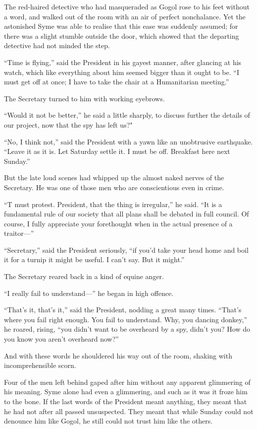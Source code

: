 \documentclass{book}
\begin{document}
The red-haired detective who had masqueraded as Gogol rose to his feet without a word, and walked out of the room with an air of perfect nonchalance. Yet the astonished Syme was able to realise that this ease was suddenly assumed; for there was a slight stumble outside the door, which showed that the departing detective had not minded the step.

“Time is flying,” said the President in his gayest manner, after glancing at his watch, which like everything about him seemed bigger than it ought to be. “I must get off at once; I have to take the chair at a Humanitarian meeting.”

The Secretary turned to him with working eyebrows.

“Would it not be better,” he said a little sharply, to discuss further the details of our project, now that the spy has left us?"

“No, I think not,” said the President with a yawn like an unobtrusive earthquake. “Leave it as it is. Let Saturday settle it. I must be off. Breakfast here next Sunday.”

But the late loud scenes had whipped up the almost naked nerves of the Secretary. He was one of those men who are conscientious even in crime.

“T must protest. President, that the thing is irregular,” he said. “It is a fundamental rule of our society that all plans shall be debated in full council. Of course, I fully appreciate your forethought when in the actual presence of a traitor—”

“Secretary,” said the President seriously, “if you’d take your head home and boil it for a turnip it might be useful. I can’t say. But it might.”

The Secretary reared back in a kind of equine anger.

“I really fail to understand—” he began in high offence.

“That’s it, that’s it,” said the President, nodding a great many times. “That’s where you fail right enough. You fail to understand. Why, you dancing donkey,” he roared, rising, “you didn’t want to be overheard by a spy, didn’t you? How do you know you aren’t overheard now?”

And with these words he shouldered his way out of the room, shaking with incomprehensible scorn.

Four of the men left behind gaped after him without any apparent glimmering of his meaning. Syme alone had even a glimmering, and such as it was it froze him to the bone. If the last words of the President meant anything, they meant that he had not after all passed unsuspected. They meant that while Sunday could not denounce him like Gogol, he still could not trust him like the others.
\end{document}
